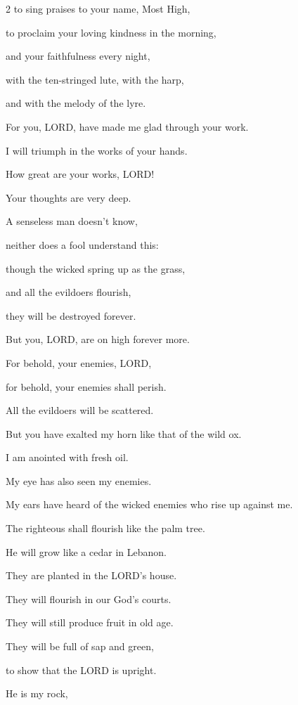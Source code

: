 \begin{multicols}{2}
	to sing praises to your name, Most High,
	
	
	\myverse{}to proclaim your loving kindness in the morning,
	
	and your faithfulness every night,
	
	
	\myverse{}with the ten-stringed lute, with the harp,
	
	and with the melody of the lyre.
	
	
	\myverse{}For you, LORD, have made me glad through your work.
	
	I will triumph in the works of your hands.
	
	
	\myverse{}How great are your works, LORD!
	
	Your thoughts are very deep.
	
	
	\myverse{}A senseless man doesn’t know,
	
	neither does a fool understand this:
	
	
	\myverse{}though the wicked spring up as the grass,
	
	and all the evildoers flourish,
	
	they will be destroyed forever.
	
	
	\myverse{}But you, LORD, are on high forever more.
	
	
	\myverse{}For behold, your enemies, LORD,
	
	for behold, your enemies shall perish.
	
	All the evildoers will be scattered.
	
	
	\myverse{}But you have exalted my horn like that of the wild ox.
	
	I am anointed with fresh oil.
	
	
	\myverse{}My eye has also seen my enemies.
	
	My ears have heard of the wicked enemies who rise up against me.
	
	
	\myverse{}The righteous shall flourish like the palm tree.
	
	He will grow like a cedar in Lebanon.
	
	
	\myverse{}They are planted in the LORD’s house.
	
	They will flourish in our God’s courts.
	
	
	\myverse{}They will still produce fruit in old age.
	
	They will be full of sap and green,
	
	
	\myverse{}to show that the LORD is upright.
	
	He is my rock,
	

\end{multicols}
